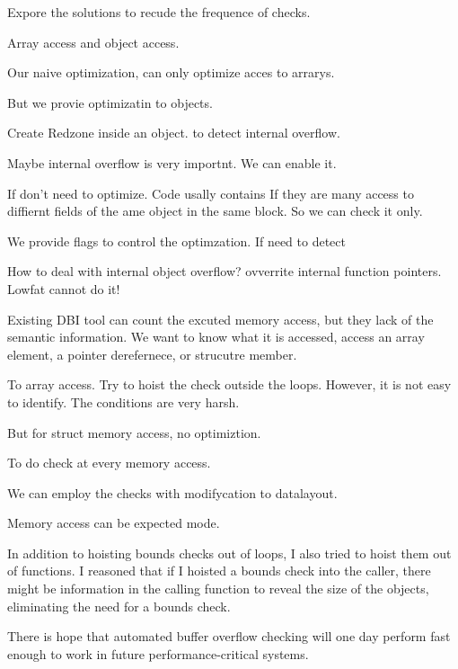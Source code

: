 Expore the solutions to recude the frequence of checks.

Array access and object access.

Our naive optimization, can only optimize acces to arrarys.

But we provie optimizatin to objects.

Create Redzone inside an object. to detect internal overflow.

Maybe internal overflow is very importnt.
We can enable it.



If don't need to optimize.
Code usally contains If they are many access to diffiernt fields of the ame object in the same block.
So we can check it only.


We provide flags to control the optimzation.
If need to detect

How to deal with internal object overflow? ovverrite internal function pointers.
Lowfat cannot do it!


Existing DBI tool can count the excuted memory access, but they lack of the semantic information.
We want to know what it is accessed, access an array element, a pointer derefernece, or strucutre member.




To array access.
Try to hoist the check outside the loops.
However, it is not easy to identify.
The conditions are very harsh.

But for struct memory access, no optimiztion.

To do check at every memory access.

We can employ the checks with modifycation to
datalayout.

Memory access can be expected mode.









In addition to hoisting bounds checks out of loops, I also tried to hoist them out of functions. I reasoned that if I hoisted a bounds check into the caller, there might be information in the calling function to reveal the size of the objects, eliminating the need for a bounds check.


There is hope that automated buffer overflow checking will one day perform fast enough to work in future performance-critical systems.


